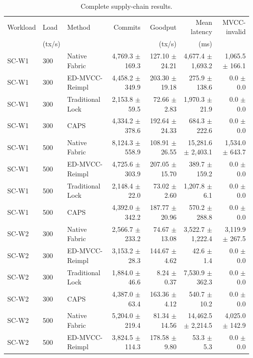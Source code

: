 \documentclass[fleqn,10pt,lineno]{wlpeerj}
\begin{document}
\begin{table}[ht]
\centering
\scriptsize
\caption{Complete supply-chain results.}
\label{tab:supplychain-full}
\begin{tabularx}{\textwidth}{@{}p{}p{}Xrrrr@{}}
\toprule
Workload & Load & Method & Commits & Goodput & Mean latency & MVCC-invalid \\
 & (tx/s) & & & (tx/s) & (ms) & \\
\midrule
SC-W1 & 300 & Native Fabric & 4,769.3 $\pm$ 169.3 & 127.10 $\pm$ 24.21 & 4,677.4 $\pm$ 1,693.2 & 1,065.5 $\pm$ 166.1 \\
SC-W1 & 300 & ED-MVCC-Reimpl & 4,458.2 $\pm$ 349.9 & 203.30 $\pm$ 19.18 & 275.9 $\pm$ 138.6 & 0.0 $\pm$ 0.0 \\
SC-W1 & 300 & Traditional Lock & 2,153.8 $\pm$ 59.5 & 72.66 $\pm$ 2.83 & 1,970.3 $\pm$ 21.9 & 0.0 $\pm$ 0.0 \\
SC-W1 & 300 & CAPS & 4,334.2 $\pm$ 378.6 & 192.64 $\pm$ 24.33 & 684.3 $\pm$ 222.6 & 0.0 $\pm$ 0.0 \\
\addlinespace
SC-W1 & 500 & Native Fabric & 8,124.3 $\pm$ 558.9 & 108.91 $\pm$ 26.55 & 15,281.6 $\pm$ 2,403.1 & 1,534.0 $\pm$ 643.7 \\
SC-W1 & 500 & ED-MVCC-Reimpl & 4,725.6 $\pm$ 303.9 & 207.05 $\pm$ 15.70 & 389.7 $\pm$ 159.2 & 0.0 $\pm$ 0.0 \\
SC-W1 & 500 & Traditional Lock & 2,148.4 $\pm$ 22.0 & 73.02 $\pm$ 2.60 & 1,207.8 $\pm$ 6.1 & 0.0 $\pm$ 0.0 \\
SC-W1 & 500 & CAPS & 4,392.0 $\pm$ 342.2 & 187.77 $\pm$ 20.96 & 570.2 $\pm$ 288.8 & 0.0 $\pm$ 0.0 \\
\addlinespace
SC-W2 & 300 & Native Fabric & 2,566.7 $\pm$ 233.2 & 74.67 $\pm$ 13.08 & 3,522.7 $\pm$ 1,222.4 & 3,119.9 $\pm$ 267.5 \\
SC-W2 & 300 & ED-MVCC-Reimpl & 3,153.2 $\pm$ 28.3 & 144.67 $\pm$ 4.62 & 42.6 $\pm$ 1.4 & 0.0 $\pm$ 0.0 \\
SC-W2 & 300 & Traditional Lock & 1,884.0 $\pm$ 46.6 & 8.24 $\pm$ 0.37 & 7,530.9 $\pm$ 362.3 & 0.0 $\pm$ 0.0 \\
SC-W2 & 300 & CAPS & 4,387.0 $\pm$ 63.4 & 163.36 $\pm$ 4.12 & 540.7 $\pm$ 10.2 & 0.0 $\pm$ 0.0 \\
\addlinespace
SC-W2 & 500 & Native Fabric & 5,204.0 $\pm$ 219.4 & 81.34 $\pm$ 14.56 & 14,462.5 $\pm$ 2,214.5 & 4,025.0 $\pm$ 142.9 \\
SC-W2 & 500 & ED-MVCC-Reimpl & 3,824.5 $\pm$ 114.3 & 178.58 $\pm$ 9.80 & 53.3 $\pm$ 5.3 & 0.0 $\pm$ 0.0 \\

\end{tabularx}
\end{table}
\end{document}
